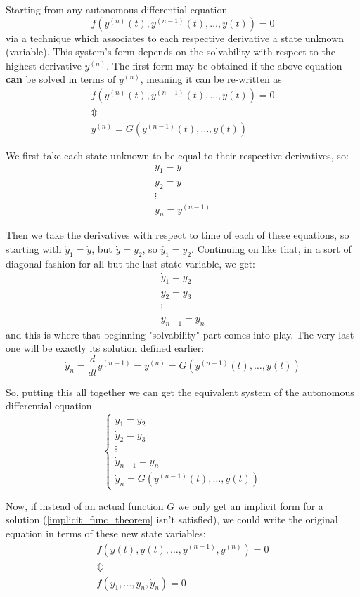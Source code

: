 Starting from any autonomous differential equation
\[
	f(y^{(n)}(t), y^{(n-1)}(t), \dots, y(t))= 0
\]
via a technique which associates to each respective derivative a state unknown (variable). \cite{eigensteve}
This system's form depends on the solvability with respect to the highest derivative $y^{(n)}$.
The first form may be obtained if the above equation \textbf{can} be solved in terms of $y^{(n)}$, meaning it can be re-written as
\begin{gather*}
	f(y^{(n)}(t), y^{(n-1)}(t), \dots, y(t))= 0 \\
	\Updownarrow \\
	y^{(n)}  = G(y^{(n-1)}(t), \dots, y(t))
\end{gather*}

We first take each state unknown to be equal to their respective derivatives, so:
\begin{gather*}
	y_1 = y     \\
	y_2 = \dot{y} \\
	\vdots \\
	y_n = y^{(n-1)}
\end{gather*}

Then we take the derivatives with respect to time of each of these equations, so starting with $\dot{y}_1 = \dot{y}$, but $\dot{y} = y_2$, so $\dot{y_1}=y_2$. Continuing on like that, in a sort of diagonal fashion for all but the last state variable, we get:
\begin{gather*}
	\dot{y}_1 = y_2 \\
	\dot{y}_2 = y_3 \\
	\vdots \\
	\dot{y}_{n-1} = y_n
\end{gather*}
and this is where that beginning "solvability" part comes into play. The very last one will be exactly its solution defined earlier:
\[
	\dot{y}_n = \frac{d}{dt}y^{(n-1)} = y^{(n)}  = G(y^{(n-1)}(t), \dots, y(t))
\]

So, putting this all together we can get the equivalent system of the autonomous differential equation
\[
	\begin{cases}
		\dot{y}_1 = y_2     \\
		\dot{y}_2 = y_3     \\
		\vdots              \\
		\dot{y}_{n-1} = y_n \\
		\dot{y}_n  = G(y^{(n-1)}(t), \dots, y(t))
	\end{cases}
\]

Now, if instead of an actual function $G$ we only get an implicit form for a solution (\ref{implicit_func_theorem} isn't satisfied), we could write the original equation in terms of these new state variables:
\begin{gather*}
	f(y(t), \dot{y}(t),\dots,y^{(n-1)},y^{(n)})= 0 \\
	\Updownarrow \\
	f(y_1,\dots,y_n,\dot{y}_n) = 0
\end{gather*}

